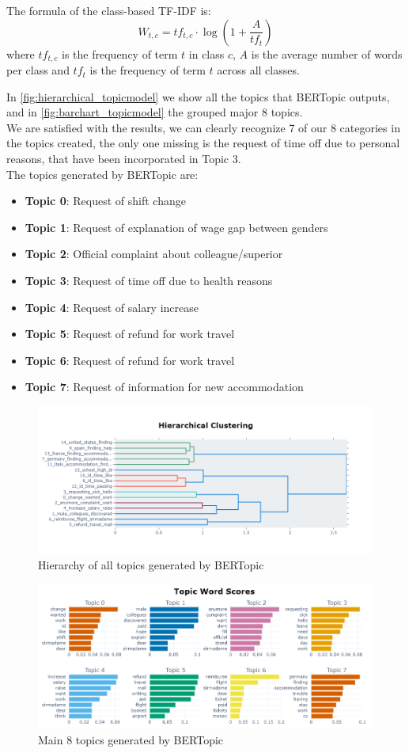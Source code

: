 The formula of the class-based TF-IDF is:
\begin{equation*}
    W_{t,c} = tf_{t,c} \cdot \log(1 + \frac{A}{tf_{t}})
\end{equation*}
where $tf_{t,c}$ is the frequency of term $t$ in class $c$, $A$ is the average number of words per class and $tf_{t}$ is the frequency of term $t$ across all classes.

In \autoref{fig:hierarchical_topicmodel} we show all the topics that BERTopic outputs, and in \autoref{fig:barchart_topicmodel} the grouped major 8 topics. \\
We are satisfied with the results, we can clearly recognize 7 of our 8 categories in the topics created, the only one missing is the request of time off due to personal reasons, that have been incorporated in Topic 3. \\
The topics generated by BERTopic are:
\begin{itemize}
    \item \textbf{Topic 0}: Request of shift change
    \item \textbf{Topic 1}: Request of explanation of wage gap between genders
    \item \textbf{Topic 2}: Official complaint about colleague/superior
    \item \textbf{Topic 3}: Request of time off due to health reasons
    \item \textbf{Topic 4}: Request of salary increase
    \item \textbf{Topic 5}: Request of refund for work travel
    \item \textbf{Topic 6}: Request of refund for work travel
    \item \textbf{Topic 7}: Request of information for new accommodation
\end{itemize}


\begin{figure}[h] 
    \includegraphics[width=\textwidth]{images/hierarchy_topic_model.png}
    \caption{Hierarchy of all topics generated by BERTopic}
    \label{fig:hierarchical_topicmodel}
\end{figure}


\begin{figure}[h] 
    \includegraphics[width=\textwidth]{images/barchart_topicmodel.png}
    \caption{Main 8 topics generated by BERTopic}
    \label{fig:barchart_topicmodel}
\end{figure}    
